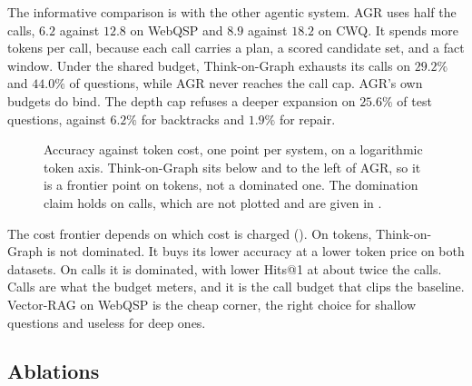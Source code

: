 The informative comparison is with the other agentic system. AGR uses half the
calls, $6.2$ against $12.8$ on WebQSP and $8.9$ against $18.2$ on CWQ. It spends
more tokens per call, because each call carries a plan, a scored candidate set,
and a fact window. Under the shared budget, Think-on-Graph exhausts its calls on
$29.2\%$ and $44.0\%$ of questions, while AGR never reaches the call cap. AGR's
own budgets do bind. The depth cap refuses a deeper expansion on $25.6\%$ of
test questions, against $6.2\%$ for backtracks and $1.9\%$ for repair.

\begin{figure}[!t]
\centering

\caption{Accuracy against token cost, one point per system, on a logarithmic
  token axis. Think-on-Graph sits below and to the left of AGR, so it is a
  frontier point on tokens, not a dominated one. The domination claim holds on
  calls, which are not plotted and are given in .}
\label{fig:cost}
\end{figure}

The cost frontier depends on which cost is charged (). On tokens,
Think-on-Graph is not dominated. It buys its lower accuracy at a lower token
price on both datasets. On calls it is dominated, with lower Hits@1 at about
twice the calls. Calls are what the budget meters, and it is the call budget
that clips the baseline. Vector-RAG on WebQSP is the cheap corner, the right
choice for shallow questions and useless for deep ones.

\subsection{Ablations}\label{sec:ablations}

